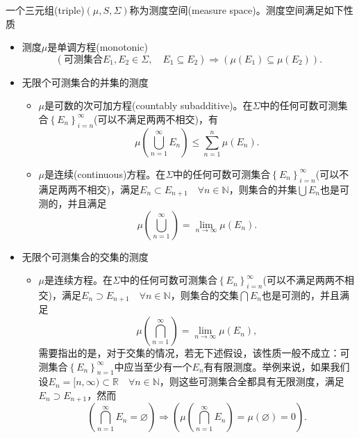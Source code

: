 \begin{definition}[测度空间]
  \label{definition:measure-measure-space}
一个三元组(triple)$\left( \mu,  S, \Sigma \right)$称为测度空间(measure space)。测度空间满足如下性质
\begin{itemize}
  \item 测度$\mu$是单调方程(monotonic)
  \begin{equation*}
    \left( \text{可测集合} E_1,E_2 \in \Sigma, \quad E_1 \subseteq E_2 \right) \Rightarrow \left( \mu(E_1) \subseteq \mu(E_2) \right).
  \end{equation*}
  \item 无限个可测集合的并集的测度
  \begin{itemize}
    \item $\mu$是可数的次可加方程(countably subadditive)。在$\Sigma$中的任何可数可测集合$\left\{E_n \right\}_{i=n}^{\infty}$(可以不满足两两不相交)，有
    \begin{equation*}
      \mu \left( \bigcup_{n=1}^{\infty} E_n \right) \le \sum_{n=1}^{n} \mu(E_n).
    \end{equation*}
    \item $\mu$是连续(continuous)方程。在$\Sigma$中的任何可数可测集合$\left\{E_n \right\}_{i=n}^{\infty}$(可以不满足两两不相交)，满足$E_n \subset E_{n+1} \quad \forall n \in \mathbb{N}$，则集合的并集$\bigcup E_n$也是可测的，并且满足
    \begin{equation*}
      \mu \left( \bigcup_{n=1}^{\infty} \right) = \lim_{n\rightarrow \infty} \mu \left(E_n \right).
    \end{equation*}
  \end{itemize}
  \item 无限个可测集合的交集的测度
  \begin{itemize}
    \item $\mu$是连续方程。在$\Sigma$中的任何可数可测集合$\left\{E_n \right\}_{i=n}^{\infty}$(可以不满足两两不相交)，满足$E_n \supset E_{n+1} \quad \forall n \in \mathbb{N}$，则集合的交集$\bigcap E_n$也是可测的，并且满足
    \begin{equation*}
      \mu \left( \bigcap_{n=1}^{\infty} \right) = \lim_{n\rightarrow \infty} \mu \left(E_n \right),
    \end{equation*}
    需要指出的是，对于交集的情况，若无下述假设，该性质一般不成立：可测集合$\left\{ E_n \right\}_{n=1}^{\infty}$中应当至少有一个$E_n$有有限测度。举例来说，如果我们设$E_n = [ n, \infty ) \subset \mathbb{R} \quad \forall n \in \mathbb{N}$，则这些可测集合全都具有无限测度，满足$E_{n} \supset E_{n+1}$，然而
    \begin{equation*}
      \left( \bigcap_{n=1}^{\infty} E_n = \varnothing \right) \Rightarrow \left( \mu \left( \bigcap_{n=1}^{\infty} E_n \right) = \mu \left( \varnothing \right) = 0 \right).
    \end{equation*}
  \end{itemize}
\end{itemize}
\end{definition}

